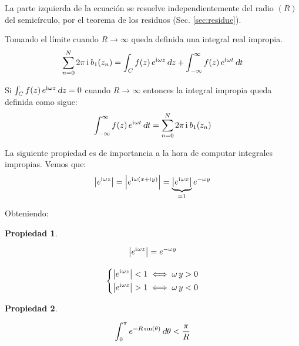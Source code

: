 \documentclass[a5paper,12pt,twoside]{book}
\newtheorem{prop}{{Propiedad}}[chapter]
\begin{document}
La parte izquierda de la ecuación se resuelve independientemente del radio $(R)$ del semicírculo, por el teorema de los residuos (Sec. \ref{sec:residue}).

Tomando el límite cuando $R\to\infty$ queda definida una integral real impropia.
\begin{equation*}
    \sum_{n=0}^N 2 \pi \, \mathrm{i}\mkern1mu \, b_1(z_n) = \int_C f(z) \, e^{\mathrm{i}\mkern1mu \omega z} \, \textsl{d} z + \int_{-\infty}^{\infty} f(z) \, e^{\mathrm{i}\mkern1mu \omega t} \, \textsl{d} t
\end{equation*}

Si $\int_C f(z) \, e^{\mathrm{i}\mkern1mu \omega z} \, \textsl{d} z = 0$ cuando $R \to \infty$ entonces la integral impropia queda definida como sigue:
\begin{equation*}
    \int_{-\infty}^{\infty} f(z) \, e^{\mathrm{i}\mkern1mu \omega t} \, \textsl{d} t = \sum_{n=0}^N 2 \pi \, \mathrm{i}\mkern1mu \, b_1(z_n)
\end{equation*}

La siguiente propiedad es de importancia a la hora de computar integrales impropias. Vemos que:
\begin{equation*}
    {\left| {e^{\mathrm{i}\mkern1mu\omega z}} \right|} = {\left| {e^{\mathrm{i}\mkern1mu \omega \left(x + \mathrm{i}\mkern1mu y\right)}} \right|} = \underbrace{{\left| {e^{\mathrm{i}\mkern1mu \omega x}} \right|}}_{=1} e^{-\omega y}
\end{equation*}

Obteniendo:

\begin{mdframed}[style=MyFrame1]
    \begin{prop}
    \end{prop}
    \begin{gather*}
        {\left| {e^{\mathrm{i}\mkern1mu\omega z}} \right|} = e^{-\omega y}
        \\[1em]
        \left\{
        \begin{aligned}
            {\left| {e^{\mathrm{i}\mkern1mu\omega z}} \right|} &< 1 \iff \omega \, y > 0
            \\
            {\left| {e^{\mathrm{i}\mkern1mu \omega z}} \right|} &> 1 \iff \omega \, y < 0
        \end{aligned}
        \right.
    \end{gather*}
\end{mdframed}

\begin{mdframed}[style=MyFrame1]
    \begin{prop}
    \end{prop}
    \begin{equation*}
        \int_0^\pi e^{-R \sin(\theta)} \, \textsl{d} \theta < \frac{\pi}{R}
    \end{equation*}
\end{mdframed}
\end{document}
